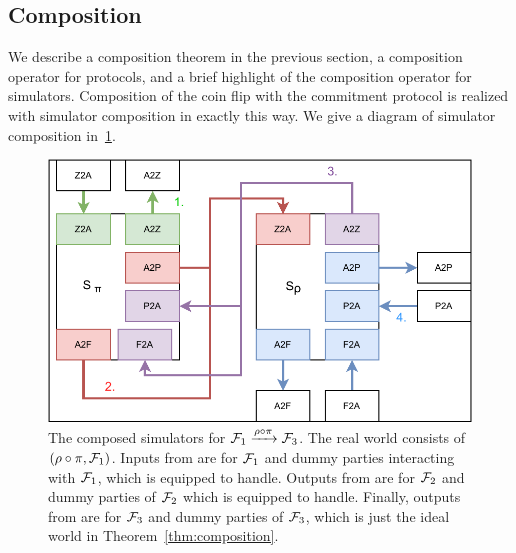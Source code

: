 \subsection{Composition}
We describe a composition theorem in the previous section, a composition operator for protocols, and a brief highlight of the composition operator for simulators.
Composition of the coin flip with the commitment protocol is realized with simulator composition in exactly this way.
We give a diagram of simulator composition in~\ref{fig:simcomp}.
\begin{figure}
\centering
\includegraphics[scale=0.5]{figures/simcomp.pdf}
\caption{The composed simulators for $\mathcal{F}_1 \xrightarrow{\rho \circ \pi} \mathcal{F}_3$. The real world consists of $(\rho \circ \pi, \mathcal{F}_1)$. Inputs from \Z are for $\mathcal{F}_1$ and dummy parties interacting with $\mathcal{F}_1$, which \SIM{\pi} is equipped to handle. Outputs from \SIM{\pi} are for $\mathcal{F}_2$ and dummy parties of $\mathcal{F}_2$ which \SIM{\rho} is equipped to handle. Finally, outputs from \SIM{\rho} are for $\mathcal{F}_3$ and dummy parties of $\mathcal{F}_3$, which is just the ideal world in Theorem~\ref{thm:composition}.}
\label{fig:simcomp}
\end{figure}
